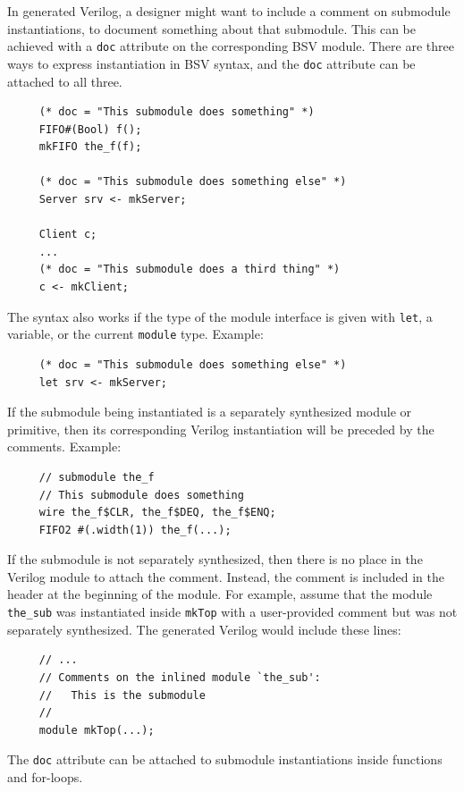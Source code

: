 \documentclass[twoside,letterpaper]{article}
\newcommand{\te}[1]{\texttt{#1}}
\begin{document}
In generated Verilog, a designer might want to include a comment on
submodule instantiations,  to document something about that submodule.
This can be achieved with a \te{doc} attribute on the corresponding BSV
module.  There are three ways to express instantiation in BSV syntax,
and the \te{doc} attribute can be attached to all three.
\begin{verbatim}
     (* doc = "This submodule does something" *)
     FIFO#(Bool) f();
     mkFIFO the_f(f);

     (* doc = "This submodule does something else" *)
     Server srv <- mkServer;

     Client c;
     ...
     (* doc = "This submodule does a third thing" *)
     c <- mkClient;
\end{verbatim}
The syntax also works if the type of the module interface is given
with \te{let}, a variable, or the current \te{module} type.  Example:
\begin{verbatim}
     (* doc = "This submodule does something else" *)
     let srv <- mkServer;
\end{verbatim}
If the submodule being instantiated is a separately synthesized module or primitive, then its corresponding Verilog instantiation will be preceded by the comments.  Example:
\begin{verbatim}
     // submodule the_f
     // This submodule does something
     wire the_f$CLR, the_f$DEQ, the_f$ENQ;
     FIFO2 #(.width(1)) the_f(...);
\end{verbatim}
If the submodule is not separately synthesized, then there is no place
in the Verilog module to attach the comment.  Instead, the comment is
included in the header at the beginning of the module.  For example,
assume that the module \te{the\_sub} was instantiated inside \te{mkTop} with
a user-provided comment but was not separately synthesized.  The generated
Verilog would include these lines:
\begin{verbatim}
     // ...
     // Comments on the inlined module `the_sub':
     //   This is the submodule
     //
     module mkTop(...);
\end{verbatim}
The \te{doc} attribute can be attached to submodule instantiations inside
functions and for-loops.
\end{document}
